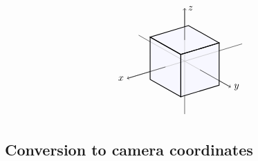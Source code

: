 \begin{equation*}
  \begin{tikzpicture}[x={(0.8cm,-0.45cm)},y={(1cm,0.3cm)},z={(0cm,1.1cm)},scale=0.7]
    \draw[->] (-3,0,0) -- (3,0,0) node[right]{$y$};
    \draw[->] (0,3,0) -- (0,-3,0) node[left]{$x$};
    \draw[->] (0,0,-2.5) -- (0,0,2.5) node[right]{$z$};
    \begin{scope}
      \clip (1,1,1) -- (1,1,-1) -- (1,-1,-1) -- (-1,-1,-1)
      -- (-1,-1,1) -- (-1,1,1) -- cycle;
      \fill[blue!3] (1,1,1) -- (1,1,-1) -- (1,-1,-1) -- (-1,-1,-1)
      -- (-1,-1,1) -- (-1,1,1) -- cycle;
      \draw[black!30,->] (-3,0,0) -- (3,0,0);
      \draw[black!30,->] (0,-3,0) -- (0,3,0);
      \draw[black!30,->] (0,0,-2.5) -- (0,0,2.5);
    \end{scope}
    \draw[thick] ( 1, 1, 1) -- ( 1, 1,-1) -- ( 1,-1,-1) -- ( 1,-1, 1) -- cycle;
    \draw[thick] ( 1,-1, 1) -- (-1,-1, 1) -- (-1,-1,-1) -- ( 1,-1,-1) -- cycle;
    \draw[thick] ( 1, 1, 1) -- ( 1,-1, 1) -- (-1,-1, 1) -- (-1, 1, 1) -- cycle;
    \draw (1,0,0) -- (3,0,0);
    \draw (0,-3,0) -- (0,-1,0);
    \draw (0,0,1) -- (0,0,2.5);
  \end{tikzpicture}
\end{equation*}

\subsection*{Conversion to camera coordinates}

